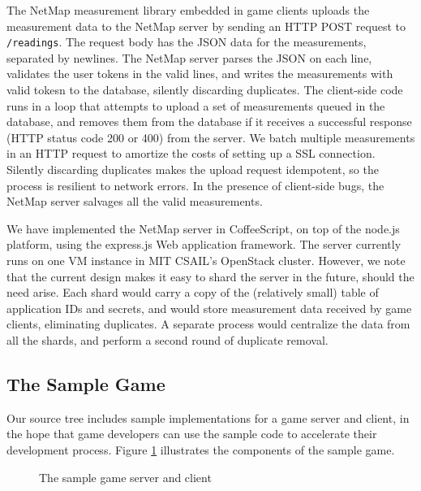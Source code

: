The NetMap measurement library embedded in game clients uploads the measurement
data to the NetMap server by sending an HTTP POST request to
\texttt{/readings}. The request body has the JSON data for the measurements,
separated by newlines. The NetMap server parses the JSON on each line,
validates the user tokens in the valid lines, and writes the measurements with
valid tokesn to the database, silently discarding duplicates. The client-side
code runs in a loop that attempts to upload a set of measurements queued in the
database, and removes them from the database if it receives a successful
response (HTTP status code 200 or 400) from the server. We batch multiple
measurements in an HTTP request to amortize the costs of setting up a SSL
connection. Silently discarding duplicates makes the upload request idempotent,
so the process is resilient to network errors. In the presence of client-side
bugs, the NetMap server salvages all the valid measurements.

We have implemented the NetMap server in CoffeeScript, on top of the node.js
platform, using the express.js Web application framework. The server currently
runs on one VM instance in MIT CSAIL's OpenStack cluster.
However, we note that the current
design makes it easy to shard the server in the future, should the need arise.
Each shard would carry a copy of the (relatively small) table of application
IDs and secrets, and would store measurement data received by game clients,
eliminating duplicates. A separate process would centralize the data from all
the shards, and perform a second round of duplicate removal.

\subsection{The Sample Game}

Our source tree includes sample implementations for a game server and client,
in the hope that game developers can use the sample code to accelerate their
development process. Figure \ref{fig:sample} illustrates the components of the
sample game.

\begin{figure}[hbtp]
  \caption{
    The sample game server and client
  }
  \label{fig:sample}
\end{figure}

